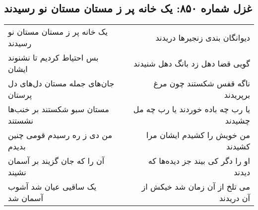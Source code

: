 \begin{center}
\section*{غزل شماره ۸۵۰: یک خانه پر ز مستان مستان نو رسیدند}
\label{sec:0850}
\begin{longtable}{l p{0.5cm} r}
یک خانه پر ز مستان مستان نو رسیدند
&&
دیوانگان بندی زنجیرها دریدند
\\
بس احتیاط کردیم تا نشنوند ایشان
&&
گویی قضا دهل زد بانگ دهل شنیدند
\\
جان‌های جمله مستان دل‌های دل پرستان
&&
ناگه قفس شکستند چون مرغ برپریدند
\\
مستان سبو شکستند بر خنب‌ها نشستند
&&
یا رب چه باده خوردند یا رب چه مل چشیدند
\\
من دی ز ره رسیدم قومی چنین بدیدم
&&
من خویش را کشیدم ایشان مرا کشیدند
\\
آن را که جان گزیند بر آسمان نشیند
&&
او را دگر کی بیند جز دیده‌ها که دیدند
\\
یک ساقیی عیان شد آشوب آسمان شد
&&
می تلخ از آن زمان شد خیکش از آن دریدند
\\
\end{longtable}
\end{center}
